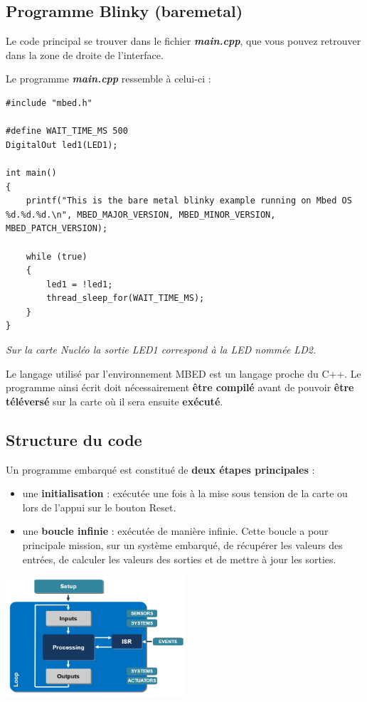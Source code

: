 \documentclass[a4paper,11pt,titlepage]{article} %
\begin{document}
\newpage
\subsection{Programme Blinky (baremetal)}

Le code principal se trouver dans le fichier \textsl{\textbf{main.cpp}}, que vous pouvez retrouver dans la zone de droite de l'interface.

Le programme \textsl{\textbf{main.cpp}} ressemble à celui-ci :

\begin{lstlisting}
#include "mbed.h"

#define WAIT_TIME_MS 500 
DigitalOut led1(LED1);

int main()
{
    printf("This is the bare metal blinky example running on Mbed OS %d.%d.%d.\n", MBED_MAJOR_VERSION, MBED_MINOR_VERSION, MBED_PATCH_VERSION);

    while (true)
    {
        led1 = !led1;
        thread_sleep_for(WAIT_TIME_MS);
    }
}

\end{lstlisting}

\textit{Sur la carte Nucléo la sortie LED1 correspond à la LED nommée LD2.}

Le langage utilisé par l'environnement MBED est un langage proche du C++. Le programme ainsi écrit doit nécessairement \textbf{être compilé} avant de pouvoir \textbf{être téléversé} sur la carte où il sera ensuite \textbf{exécuté}.

\subsection{Structure du code}

Un programme embarqué est constitué de \textbf{deux étapes principales} : 

\begin{itemize}
	\item une \textbf{initialisation} : exécutée une fois à la mise sous tension de la carte ou lors de l'appui sur le bouton Reset.
	\item une \textbf{boucle infinie} : exécutée de manière infinie. Cette boucle a pour principale mission, sur un système embarqué, de récupérer les valeurs des entrées, de calculer les valeurs des sorties et de mettre à jour les sorties.
\end{itemize}

\begin{center}
	\includegraphics[width=0.5\textwidth]{images/arduino_program_structure.png}
\end{center}
\end{document}
